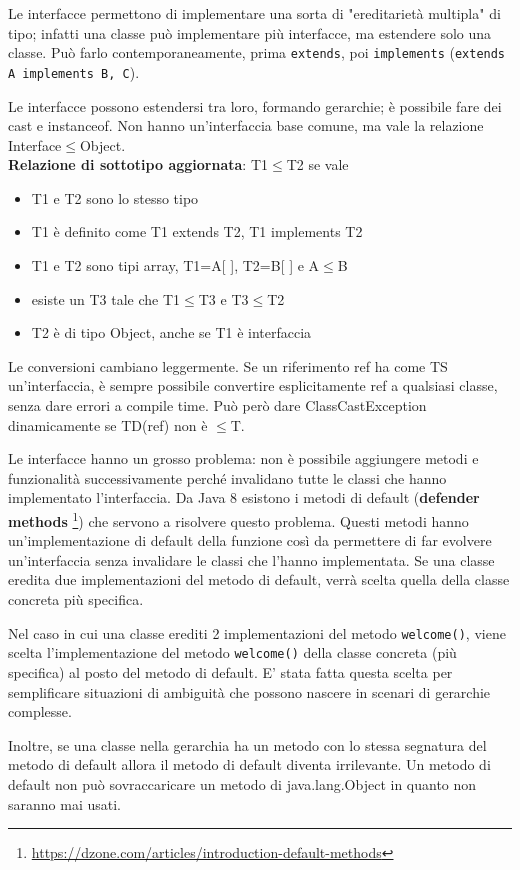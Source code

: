 Le interfacce permettono di implementare una sorta di "ereditarietà multipla" di tipo; infatti una classe può implementare più interfacce, ma estendere solo una classe. Può farlo contemporaneamente, prima \texttt{extends}, poi \texttt{implements} (\texttt{extends A implements B, C}).

Le interfacce possono estendersi tra loro, formando gerarchie; è possibile fare dei cast e instanceof. Non hanno un'interfaccia base comune, ma vale la relazione Interface$\le$Object. \\
\textbf{Relazione di sottotipo aggiornata}: T1$\le$T2 se vale
\begin{itemize}
\item T1 e T2 sono lo stesso tipo
\item T1 è definito come T1 extends T2, T1 implements T2
\item T1 e T2 sono tipi array, T1=A[ ], T2=B[ ] e A$\le$B
\item esiste un T3 tale che T1$\le$T3 e T3$\le$T2
\item T2 è di tipo Object, anche se T1 è interfaccia
\end{itemize}
Le conversioni cambiano leggermente. Se un riferimento ref ha come TS un'interfaccia, è sempre possibile convertire esplicitamente ref a qualsiasi classe, senza dare errori a compile time. Può però dare ClassCastException dinamicamente se TD(ref) non è $\le$T.

Le interfacce hanno un grosso problema: non è possibile aggiungere metodi e funzionalità successivamente perché invalidano tutte le classi che hanno implementato l'interfaccia. Da Java 8 esistono i metodi di default (\textbf{defender methods} \footnote{\url{https://dzone.com/articles/introduction-default-methods}}) che servono a risolvere questo problema. Questi metodi hanno un'implementazione di default della funzione così da permettere di far evolvere un'interfaccia senza invalidare le classi che l'hanno implementata. Se una classe eredita due implementazioni del metodo di default, verrà scelta quella della classe concreta più specifica.

Nel caso in cui una classe erediti 2 implementazioni del metodo \texttt{welcome()}, viene scelta l’implementazione del metodo \texttt{welcome()} della classe concreta (pi\`u specifica) al posto del metodo di default. E' stata fatta questa scelta per semplificare situazioni di ambiguit\`a che possono nascere in scenari
di gerarchie complesse.

Inoltre, se una classe nella gerarchia ha un metodo con lo stessa segnatura del metodo di default allora il metodo di default diventa irrilevante. Un metodo di default non pu\`o sovraccaricare un metodo di java.lang.Object in quanto non saranno mai usati.

